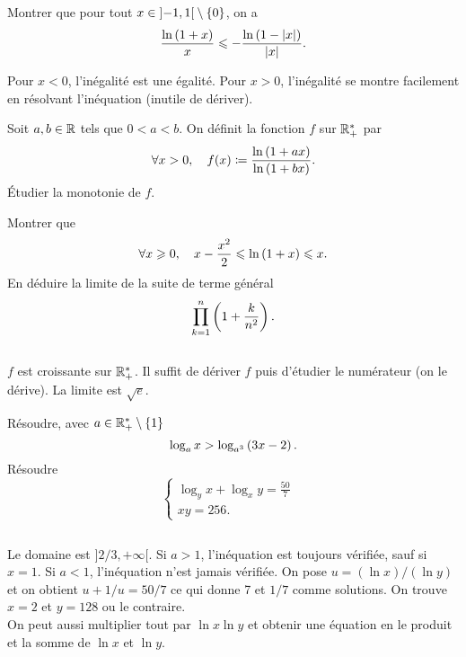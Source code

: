 \documentclass{magnolia}
\begin{document}

Montrer que pour tout $x\in\left]-1,1\right[\setminus\left\{0\right\}$, on a
\[\frac{\ln\left(1+x\right)}{x}\leqslant -\frac{\ln\left(1-\left|x\right|\right)}{\left|x\right|}.\]
\begin{sol}
Pour $x<0$, l'inégalité est une égalité. Pour $x>0$, l'inégalité se
montre facilement en résolvant l'inéquation (inutile de dériver).
\end{sol}

\begin{questions}
\question Soit $a,b\in\mathbb{R}$ tels que $0<a<b$. On définit la fonction $f$ sur $\mathbb{R}_+^*$
  par
  \[\forall x>0 ,\quad f(x)\coloneqq\frac{\ln\left(1+ax\right)}{\ln\left(1+bx\right)}.\]
  Étudier la monotonie de $f$.
\question
  \begin{questions}
  \question Montrer que
    \[\forall x\geqslant 0 ,\quad x-\frac{x^2}{2}\leqslant\ln\left(1+x\right)\leqslant x.\]
  \question En déduire la limite de la suite de terme général
    \[\prod_{k=1}^n \left(1+\frac{k}{n^2}\right).\]
  \end{questions}
\end{questions}
\begin{sol}
$\quad$
\begin{questions}
\question $f$ est croissante sur $\mathbb{R}_+^*$. Il suffit de dériver $f$ puis d'étudier
  le numérateur (on le dérive).
\question La limite est $\sqrt{e}$.
\end{questions}
\end{sol}


\begin{questions}
\question Résoudre, avec $a\in\mathbb{R}_+^*\setminus\left\{1\right\}$
  $$\log_a x > \log_{a^3}\left(3x-2\right).$$
\question Résoudre
  $$
  \begin{cases}
  \log_y x +\log_x y=\frac{50}{7} &\\
  xy=256. &
  \end{cases}
  $$
\end{questions}
\begin{sol}
$\quad$
\begin{questions}
\question Le domaine est $]2/3,+\infty[$. Si $a>1$, l'inéquation est toujours
  vérifiée, sauf si $x=1$. Si $a<1$, l'inéquation n'est jamais vérifiée.
\question On pose $u=(\ln x)/(\ln y)$ et on obtient $u+1/u=50/7$ ce qui
  donne 7 et $1/7$ comme solutions. On trouve $x=2$ et $y=128$ ou le contraire.\\
  On peut aussi multiplier tout par $\ln x\ln y$ et obtenir une équation en
  le produit et la somme de $\ln x$ et $\ln y$.
\end{questions}
\end{sol}
\end{document}
